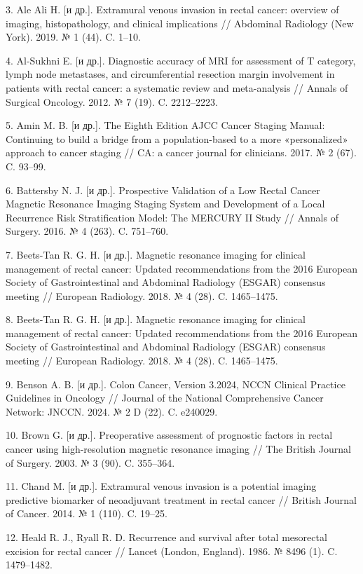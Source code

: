 \documentclass[
  russian,
  12pt,
  a4paper,
]{report}
\begin{document}
3. Ale Ali H. {[}и др.{]}. Extramural venous invasion in rectal cancer:
overview of imaging, histopathology, and clinical implications //
Abdominal Radiology (New York). 2019. № 1 (44). C. 1--10.

4. Al-Sukhni E. {[}и др.{]}. Diagnostic accuracy of MRI for assessment
of T category, lymph node metastases, and circumferential resection
margin involvement in patients with rectal cancer: a systematic review
and meta-analysis // Annals of Surgical Oncology. 2012. № 7 (19). C.
2212--2223.

5. Amin M. B. {[}и др.{]}. The Eighth Edition AJCC Cancer Staging
Manual: Continuing to build a bridge from a population-based to a more
«personalized» approach to cancer staging // CA: a cancer journal for
clinicians. 2017. № 2 (67). C. 93--99.

6. Battersby N. J. {[}и др.{]}. Prospective Validation of a Low Rectal
Cancer Magnetic Resonance Imaging Staging System and Development of a
Local Recurrence Risk Stratification Model: The MERCURY II Study //
Annals of Surgery. 2016. № 4 (263). C. 751--760.

7. Beets-Tan R. G. H. {[}и др.{]}. Magnetic resonance imaging for
clinical management of rectal cancer: Updated recommendations from the
2016 European Society of Gastrointestinal and Abdominal Radiology
(ESGAR) consensus meeting // European Radiology. 2018. № 4 (28). C.
1465--1475.

8. Beets-Tan R. G. H. {[}и др.{]}. Magnetic resonance imaging for
clinical management of rectal cancer: Updated recommendations from the
2016 European Society of Gastrointestinal and Abdominal Radiology
(ESGAR) consensus meeting // European Radiology. 2018. № 4 (28). C.
1465--1475.

9. Benson A. B. {[}и др.{]}. Colon Cancer, Version 3.2024, NCCN Clinical
Practice Guidelines in Oncology // Journal of the National Comprehensive
Cancer Network: JNCCN. 2024. № 2 D (22). C. e240029.

10. Brown G. {[}и др.{]}. Preoperative assessment of prognostic factors
in rectal cancer using high-resolution magnetic resonance imaging // The
British Journal of Surgery. 2003. № 3 (90). C. 355--364.

11. Chand M. {[}и др.{]}. Extramural venous invasion is a potential
imaging predictive biomarker of neoadjuvant treatment in rectal cancer
// British Journal of Cancer. 2014. № 1 (110). C. 19--25.

12. Heald R. J., Ryall R. D. Recurrence and survival after total
mesorectal excision for rectal cancer // Lancet (London, England). 1986.
№ 8496 (1). C. 1479--1482.
\end{document}
